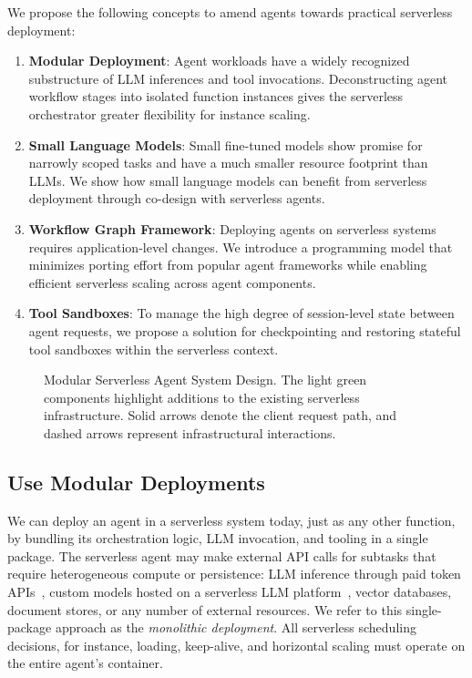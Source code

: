 We propose the following concepts to amend agents towards practical serverless deployment:
\begin{enumerate}
\item \textbf{Modular Deployment}:
Agent workloads have a widely recognized substructure of LLM inferences and tool invocations.
Deconstructing agent workflow stages into isolated function instances gives the serverless orchestrator greater flexibility for instance scaling.
\item \textbf{Small Language Models}:
Small fine-tuned models show promise for narrowly scoped tasks and have a much smaller resource footprint than LLMs.
We show how small language models can benefit from serverless deployment through co-design with serverless agents.
\item \textbf{Workflow Graph Framework}:
Deploying agents on serverless systems requires application-level changes.
We introduce a programming model that minimizes porting effort from popular agent frameworks while enabling efficient serverless scaling across agent components.
\item \textbf{Tool Sandboxes}:
To manage the high degree of session-level state between agent requests, we propose a solution for checkpointing and restoring stateful tool sandboxes within the serverless context.
\end{enumerate}

\begin{figure}[!t]
\centering
\resizebox{1\columnwidth}{!}{%

}
\caption{
Modular Serverless Agent System Design.
The light green components highlight additions to the existing serverless infrastructure.
Solid arrows denote the client request path, and dashed arrows represent infrastructural interactions.
}
\label{fig:design_overview}
\end{figure}

\subsection{Use Modular Deployments}

We can deploy an agent in a serverless system today, just as any other function, by bundling its orchestration logic, LLM invocation, and tooling in a single package.
The serverless agent may make external API calls for subtasks that require heterogeneous compute or persistence: LLM inference through paid token APIs~\cite{chatgpt, gemini, claude}, custom models hosted on a serverless LLM platform~\cite{deepserve, amazonbedrock, ocigenai, anyscale}, vector databases, document stores, or any number of external resources.
We refer to this single-package approach as the \textit{monolithic deployment}.
All serverless scheduling decisions, for instance, loading, keep-alive, and horizontal scaling must operate on the entire agent's container.

